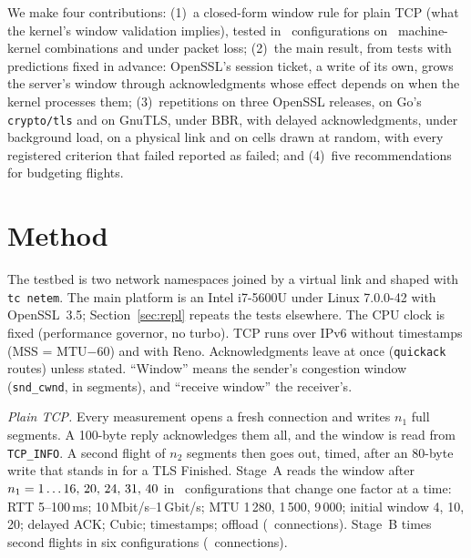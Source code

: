 \documentclass[sigconf,9pt,nonacm]{acmart}
\newcommand{\ms}{\,ms\xspace}
\begin{document}
We make four contributions: (1)~a closed-form window rule for plain TCP (what the kernel's window validation implies), tested in \NCfg\ configurations on \NCombW\ machine-kernel combinations and under packet loss; (2)~the main result, from tests with predictions fixed in advance: OpenSSL's session ticket, a write of its own, grows the server's window through acknowledgments whose effect depends on when the kernel processes them; (3)~repetitions on three OpenSSL releases, on Go's \texttt{crypto/tls} and on GnuTLS, under BBR, with delayed acknowledgments, under background load, on a physical link and on cells drawn at random, with every registered criterion that failed reported as failed; and (4)~five recommendations for budgeting flights.

\section{Method}\label{sec:method}
The testbed is two network namespaces joined by a virtual link and shaped with \texttt{tc netem}. The main platform is an Intel i7-5600U under Linux 7.0.0-42 with OpenSSL~3.5; Section~\ref{sec:repl} repeats the tests elsewhere. The CPU clock is fixed (performance governor, no turbo). TCP runs over IPv6 without timestamps (MSS = MTU$-60$) and with Reno. Acknowledgments leave at once (\texttt{quickack} routes) unless stated. ``Window'' means the sender's congestion window (\texttt{snd\_cwnd}, in segments), and ``receive window'' the receiver's.

\emph{Plain TCP.} Every measurement opens a fresh connection and writes $n_1$ full segments. A 100-byte reply acknowledges them all, and the window is read from \texttt{TCP\_INFO}. A second flight of $n_2$ segments then goes out, timed, after an 80-byte write that stands in for a TLS Finished. Stage~A reads the window after $n_1=1\ldots16,\,20,\,24,\,31,\,40$ in \NCfg\ configurations that change one factor at a time: RTT 5--100\ms; 10\,Mbit/s--1\,Gbit/s; MTU 1\,280, 1\,500, 9\,000; initial window 4, 10, 20; delayed ACK; Cubic; timestamps; offload (\NStageA\ connections). Stage~B times second flights in six configurations (\NStageB\ connections).
\end{document}
